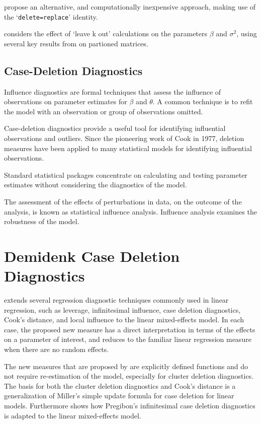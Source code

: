 \documentclass[12pt, a4paper]{report}
\theoremstyle{plain}
\theoremstyle{definition}
\theoremstyle{remark}
\begin{document}
	\citet{HaslettDillane} propose an alternative, and
	computationally inexpensive approach, making use of the
	`\texttt{delete=replace}' identity.
	
	\citet{Haslett99} considers the effect of `leave k out'
	calculations on the parameters $\beta$ and $\sigma^{2}$, using
	several key results from \citet{HaslettHayes} on partioned
	matrices.

\subsection{Case-Deletion Diagnostics}
Influence diagnostics are formal techniques that assess the influence of observations on parameter estimates for $\beta$ and $\theta$. A common technique is to refit the model with an observation or group of observations omitted.

Case-deletion diagnostics provide a useful tool for identifying influential observations and outliers. Since the pioneering work of Cook in 1977, deletion measures have been applied to many statistical models for identifying influential observations.


Standard statistical packages concentrate on calculating and testing parameter estimates without considering the diagnostics of the model. 

The assessment of the effects of perturbations in data, on the outcome of the analysis, is known as statistical influence analysis. Influence analysis examines the robustness of the model.

\section{Demidenk Case Deletion Diagnostics}
\citet{Demi} extends several regression diagnostic techniques commonly used in linear regression, such as leverage, infinitesimal influence, case deletion diagnostics, Cook's distance, and local influence to the linear mixed-effects model. In each case, the proposed new measure has a direct interpretation in terms of the effects on a parameter of interest, and reduces to the familiar linear regression measure when there are no random effects.

The new measures that are proposed by \citet{Demi} are explicitly defined functions and do not require re-estimation of the model, especially for cluster deletion diagnostics. The basis for both the cluster deletion diagnostics and Cook's distance is a generalization of Miller's simple update formula for case deletion for linear models. Furthermore \citet{Demi} shows how Pregibon's infinitesimal case deletion diagnostics is adapted to the linear mixed-effects model. 
\end{document}

